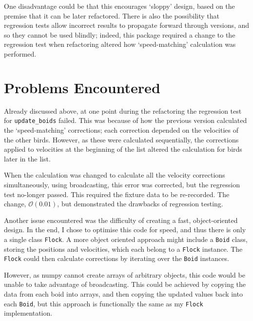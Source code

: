 \documentclass[12pt,a4paper]{article}
\begin{document}
One disadvantage could be that this encourages `sloppy' design, based on the premise that it can be later refactored. There is also the possibility that regression tests allow incorrect results to propagate forward through versions, and so they cannot be used blindly; indeed, this package required a change to the regression test when refactoring altered how `speed-matching' calculation was performed.

\section*{Problems Encountered}
Already discussed above, at one point during the refactoring the regression test for \texttt{update\_boids} failed. This was because of how the previous version calculated the `speed-matching' corrections; each correction depended on the velocities of the other birds. However, as these were calculated sequentially, the corrections applied to velocities at the beginning of the list altered the calculation for birds later in the list.

When the calculation was changed to calculate all the velocity corrections simultaneously, using broadcasting, this error was corrected, but the regression test no-longer passed. This required the fixture data to be re-recorded. The change, $\mathcal{O}(0.01)$, but demonstrated the drawbacks of regression testing.

Another issue encountered was the difficulty of creating a fast, object-oriented design. In the end, I chose to optimise this code for speed, and thus there is only a single class \texttt{Flock}. A more object oriented approach might include a \texttt{Boid} class, storing the positions and velocities, which each belong to a \texttt{Flock} instance. The \texttt{Flock} could then calculate corrections by iterating over the \texttt{Boid} instances.

However, as numpy cannot create arrays of arbitrary objects, this code would be unable to take advantage of broadcasting. This could be achieved by copying the data from each boid into arrays, and then copying the updated values back into each \texttt{Boid}, but this approach is functionally the same as my \texttt{Flock} implementation.
\end{document}

